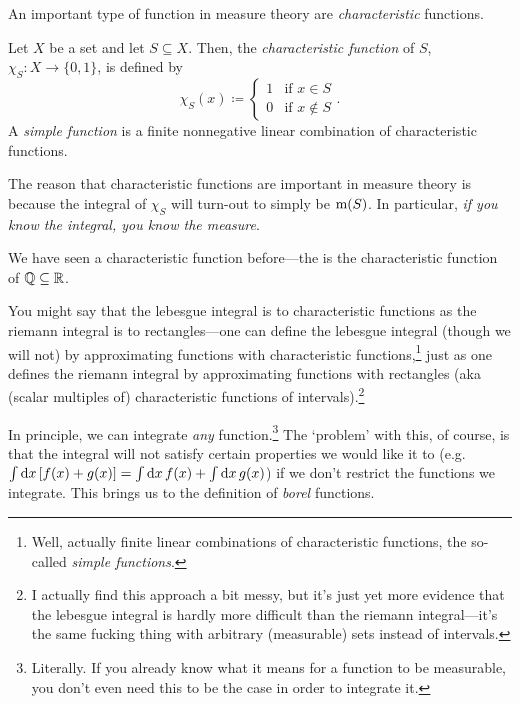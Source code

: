 An important type of function in measure theory are \emph{characteristic} functions.
\begin{dfn}
Let $X$ be a set and let $S\subseteq X$.  Then, the \emph{characteristic function} of $S$, $\chi _S:X\rightarrow \{ 0,1\}$, is defined by
\begin{equation}
\chi _S(x)\coloneqq \begin{cases}1 & \text{if }x\in S \\ 0 & \text{if }x\notin S\end{cases}.
\end{equation}
A \emph{simple function} is a finite nonnegative linear combination of characteristic functions.
\begin{rmk}
The reason that characteristic functions are important in measure theory is because the integral of $\chi _S$ will turn-out to simply be $\mathrm{m} (S)$.  In particular, \emph{if you know the integral, you know the measure}.
\end{rmk}
\begin{rmk}
We have seen a characteristic function before---the  is the characteristic function of $\mathbb{Q} \subseteq \mathbb{R}$.
\end{rmk}
\begin{rmk}
You might say that the lebesgue integral is to characteristic functions as the riemann integral is to rectangles---one can define the lebesgue integral (though we will not) by approximating functions with characteristic functions,\footnote{Well, actually finite linear combinations of characteristic functions, the so-called \emph{simple functions}.} just as one defines the riemann integral by approximating functions with rectangles (aka (scalar multiples of) characteristic functions of intervals).\footnote{I actually find this approach a bit messy, but it's just yet more evidence that the lebesgue integral is hardly more difficult than the riemann integral---it's the same fucking thing with arbitrary (measurable) sets instead of intervals.}
\end{rmk}
\end{dfn}
In principle, we can integrate \emph{any} function.\footnote{Literally.  If you already know what it means for a function to be measurable, you don't even need this to be the case in order to integrate it.}  The `problem' with this, of course, is that the integral will not satisfy certain properties we would like it to (e.g.~$\int \mathop{}\!\mathrm{d} x\, [f(x)+g(x)]=\int \mathop{}\!\mathrm{d} x\, f(x)+\int \mathop{}\!\mathrm{d} x\, g(x)$) if we don't restrict the functions we integrate.  This brings us to the definition of \emph{borel} functions.

